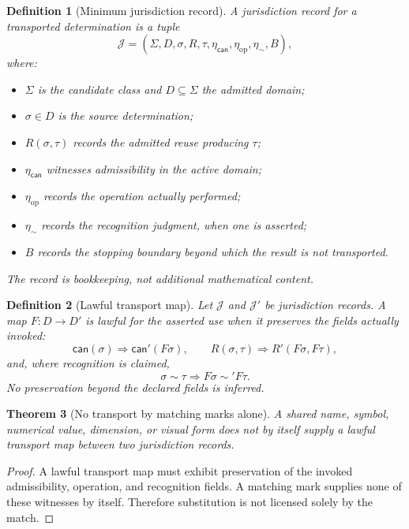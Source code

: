\documentclass[11pt,letterpaper]{article}
\theoremstyle{constraintstyle}
\newtheorem{theorem}{Theorem}[section]
\newtheorem{definition}[theorem]{Definition}
\newcommand{\Can}{\mathsf{can}}
\begin{document}
\begin{definition}[Minimum jurisdiction record]
A jurisdiction record for a transported determination is a tuple
\[
\mathcal J=(\Sigma,D,\sigma,R,\tau,\eta_{\Can},\eta_{\mathrm{op}},\eta_{\sim},B),
\]
where:
\begin{itemize}
  \item $\Sigma$ is the candidate class and $D\subseteq\Sigma$ the admitted domain;
  \item $\sigma\in D$ is the source determination;
  \item $R(\sigma,\tau)$ records the admitted reuse producing $\tau$;
  \item $\eta_{\Can}$ witnesses admissibility in the active domain;
  \item $\eta_{\mathrm{op}}$ records the operation actually performed;
  \item $\eta_{\sim}$ records the recognition judgment, when one is asserted;
  \item $B$ records the stopping boundary beyond which the result is not transported.
\end{itemize}
The record is bookkeeping, not additional mathematical content.
\end{definition}

\begin{definition}[Lawful transport map]
Let $\mathcal J$ and $\mathcal J'$ be jurisdiction records.  A map $F:D\to D'$ is lawful for the asserted use when it preserves the fields actually invoked:
\[
\Can(\sigma)\Rightarrow\Can'(F\sigma),
\qquad
R(\sigma,\tau)\Rightarrow R'(F\sigma,F\tau),
\]
and, where recognition is claimed,
\[
\sigma\sim\tau\Rightarrow F\sigma\sim' F\tau.
\]
No preservation beyond the declared fields is inferred.
\end{definition}

\begin{theorem}[No transport by matching marks alone]\label{thm:no-coercion}
A shared name, symbol, numerical value, dimension, or visual form does not by itself supply a lawful transport map between two jurisdiction records.
\end{theorem}

\begin{proof}
A lawful transport map must exhibit preservation of the invoked admissibility, operation, and recognition fields.  A matching mark supplies none of these witnesses by itself.  Therefore substitution is not licensed solely by the match.
\end{proof}
\end{document}
